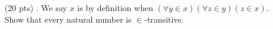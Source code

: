 \begin{enumerate}
  \item[(20 pts) \quad 6.]
    We say $x$ is  by definition when $(\forall y \in x)(\forall z \in y)(z \in x)$. \\
    Show that every natural number is $\in$-transitive.
\end{enumerate}


